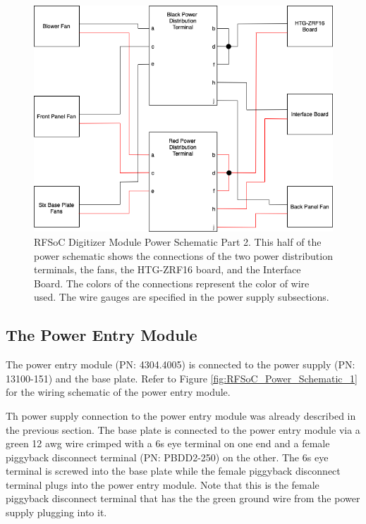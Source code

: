 \documentclass[12pt,a4paper,oneside]{article}
\begin{document}
\begin{figure}[H]
\centering
\includegraphics[width=1\linewidth]{figures/RFSoC_Power_Schematic_2.png}
\caption{RFSoC Digitizer Module Power Schematic Part 2. This half of the power schematic shows the connections of the two power distribution terminals, the fans, the HTG-ZRF16 board, and the Interface Board. The colors of the connections represent the color of wire used. The wire gauges are specified  in the power supply subsections.}
\label{fig:RFSoC_Power_Schematic_2}
\end{figure}

\subsection{The Power Entry Module}
\label{sec:6.6}

The power entry module (PN: 4304.4005) is connected to the power supply (PN: 13100-151) and the base plate. Refer to Figure \ref{fig:RFSoC_Power_Schematic_1} for the wiring schematic of the power entry module.

Th power supply connection to the power entry module was already described in the previous section. The base plate is connected to the power entry module via a green 12 awg wire crimped with a 6s eye terminal on one end and a female piggyback disconnect terminal (PN:
PBDD2-250) on the other. The 6s eye terminal is screwed into the base plate while the female piggyback disconnect terminal plugs into the power entry module. Note that this is the female piggyback disconnect terminal that has the the green ground wire from the power supply plugging into it. 
\end{document}
